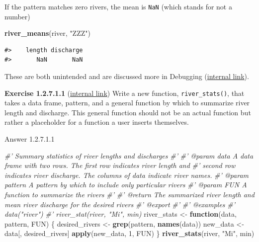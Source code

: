 \documentclass[
]{book}
\newenvironment{Shaded}{\begin{snugshade}}{\end{snugshade}}
\newcommand{\CommentTok}[1]{\textcolor[rgb]{0.56,0.35,0.01}{\textit{#1}}}
\newcommand{\ControlFlowTok}[1]{\textcolor[rgb]{0.13,0.29,0.53}{\textbf{#1}}}
\newcommand{\DecValTok}[1]{\textcolor[rgb]{0.00,0.00,0.81}{#1}}
\newcommand{\KeywordTok}[1]{\textcolor[rgb]{0.13,0.29,0.53}{\textbf{#1}}}
\newcommand{\NormalTok}[1]{#1}
\newcommand{\StringTok}[1]{\textcolor[rgb]{0.31,0.60,0.02}{#1}}
\begin{document}
If the pattern matches zero rivers, the mean is \texttt{NaN} (which stands for not a number)

\begin{Shaded}
\begin{Highlighting}[]
\KeywordTok{river_means}\NormalTok{(river, }\StringTok{"ZZZ"}\NormalTok{)}
\end{Highlighting}
\end{Shaded}

\begin{verbatim}
#>    length discharge 
#>       NaN       NaN
\end{verbatim}

These are both unintended and are discussed more in Debugging (\protect\hyperlink{debugging}{internal link}).

\textbf{Exercise 1.2.7.1.1} (\protect\hyperlink{ex-set3}{internal link})
Write a new function, \texttt{river\_stats()}, that takes a data frame, pattern, and a general function by which to summarize river length and discharge. This general function should not be an actual function but rather a placeholder for a function a user inserts themselves.

Answer 1.2.7.1.1

\begin{Shaded}
\begin{Highlighting}[]
\CommentTok{#' Summary statistics of river lengths and discharges}
\CommentTok{#'}
\CommentTok{#' @param data A data frame with two rows. The first row indicates river length and}
\CommentTok{#'   second row indicates river discharge. The columns of data indicate river names.}
\CommentTok{#' @param pattern A pattern by which to include only particular rivers}
\CommentTok{#' @param FUN A function to summarize the rivers}
\CommentTok{#'}
\CommentTok{#' @return The summarized river length and mean river discharge for the desired rivers}
\CommentTok{#' @export}
\CommentTok{#'}
\CommentTok{#' @examples}
\CommentTok{#' data("river")}
\CommentTok{#' river_stat(river, "Mi", min)}
\NormalTok{river_stats <-}\StringTok{ }\ControlFlowTok{function}\NormalTok{(data, pattern, FUN) \{}
\NormalTok{  desired_rivers <-}\StringTok{ }\KeywordTok{grep}\NormalTok{(pattern, }\KeywordTok{names}\NormalTok{(data))}
\NormalTok{  new_data <-}\StringTok{ }\NormalTok{data[, desired_rivers]}
  \KeywordTok{apply}\NormalTok{(new_data, }\DecValTok{1}\NormalTok{, FUN)}
\NormalTok{\}}
\KeywordTok{river_stats}\NormalTok{(river, }\StringTok{"Mi"}\NormalTok{, min)}
\end{Highlighting}
\end{Shaded}
\end{document}
